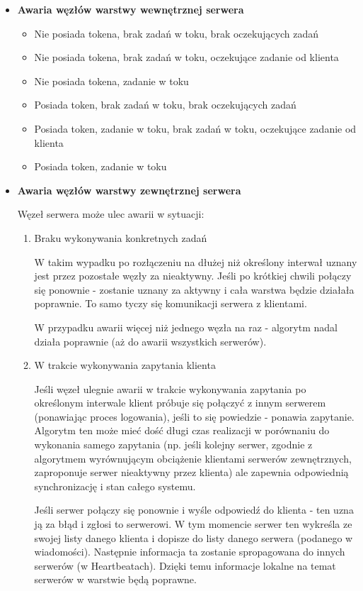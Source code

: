 {\begin{itemize}
\item \textbf{Awaria węzłów warstwy wewnętrznej serwera}
\begin{itemize}
\item Nie posiada tokena, brak zadań w toku, brak oczekujących zadań
\item Nie posiada tokena, brak zadań w toku, oczekujące zadanie od klienta
\item Nie posiada tokena, zadanie w toku
\item Posiada token, brak zadań w toku, brak oczekujących zadań
\item Posiada token, zadanie w toku, brak zadań w toku, oczekujące zadanie od klienta
\item Posiada token, zadanie w toku
\end{itemize}


\item \textbf{Awaria węzłów warstwy zewnętrznej serwera}
\par {Węzeł serwera może ulec awarii w sytuacji:}
\begin{enumerate}
\item Braku wykonywania konkretnych zadań
\par{W takim wypadku po rozłączeniu na dłużej niż określony interwał uznany jest przez pozostałe węzły za nieaktywny. Jeśli po krótkiej chwili połączy się ponownie - zostanie uznany za aktywny i cała warstwa będzie działała poprawnie. To samo tyczy się komunikacji serwera z klientami.}
\par {W przypadku awarii więcej niż jednego węzła na raz - algorytm nadal działa poprawnie (aż do awarii wszystkich serwerów).}

\item W trakcie wykonywania zapytania klienta
\par{Jeśli węzeł ulegnie awarii w trakcie wykonywania zapytania po określonym interwale klient próbuje się połączyć z innym serwerem (ponawiając proces logowania), jeśli to się powiedzie - ponawia zapytanie. Algorytm ten może mieć dość długi czas realizacji w porównaniu do wykonania samego zapytania (np. jeśli kolejny serwer, zgodnie z algorytmem wyrównującym obciążenie klientami serwerów zewnętrznych, zaproponuje serwer nieaktywny przez klienta) ale zapewnia odpowiednią synchronizację i stan całego systemu.}

\par{Jeśli serwer połączy się ponownie i wyśle odpowiedź do klienta - ten uzna ją za błąd i zgłosi to serwerowi. W tym momencie serwer ten wykreśla ze swojej listy danego klienta i dopisze do listy danego serwera (podanego w wiadomości). Następnie informacja ta zostanie spropagowana do innych serwerów (w Heartbeatach). Dzięki temu informacje lokalne na temat serwerów w warstwie będą poprawne.}


\end{enumerate}
\end{itemize}}
